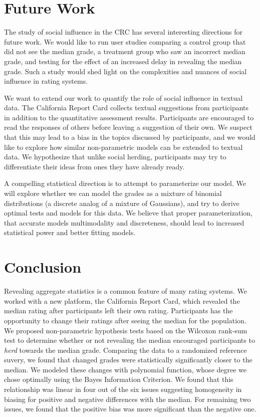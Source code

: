 \section{Future Work}
The study of social influence in the CRC has several interesting directions for future work.
We would like to run user studies comparing a control group that did not see the median grade, 
a treatment group who saw an incorrect median grade, and testing for the effect of an increased delay in revealing the median grade.
Such a study would shed light on the complexities and nuances of social influence in rating systems.
 
We want to extend our work to quantify the role of social influence in textual data. 
The California Report Card collects textual suggestions from participants in addition to the quantitative assessment results. 
Participants are encouraged to read the responses of others before leaving a suggestion of their own.
We suspect that this may lead to a bias in the topics discussed by participants, and we would like to explore how similar non-parametric models can be extended to textual data.
We hypothesize that unlike social herding, participants may try to differentiate their ideas from ones they have already ready.

A compelling statistical direction is to attempt to parameterize our model.
We will explore whether we can model the grades as a mixture of binomial distributions (a discrete analog of a mixture of Gaussians), and try to derive optimal tests and models for this data.
We believe that proper parameterization, that accurate models multimodality and discreteness, should lead to increased statistical power and better fitting models.

\section{Conclusion}
Revealing aggregate statistics is a common feature of many rating systems.
We worked with a new platform, the California Report Card, which revealed the median rating after participants left their own rating.
Participants has the opportunity to change their ratings after seeing the median for the population.
We proposed non-parametric hypothesis tests based on the Wilcoxon rank-sum test to determine whether or not revealing the median encouraged participants to \emph{herd} towards the median grade.
Comparing the data to a randomized reference suvery, we found that changed grades were statistically significantly closer to the median.
We modeled these changes with polynomial function, whose degree we chose optimally using the Bayes Information Criterion. 
We found that this relationship was linear in four out of the six issues suggesting homogeneity in biasing for positive and negative differences with the median.
For remaining two issues, we found that the positive bias was more significant than the negative one.


